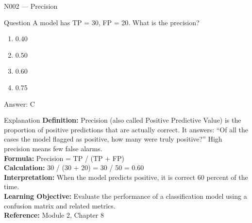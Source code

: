 \documentclass[aspectratio=169,8pt]{beamer}
\begin{document}
	\begin{frame}{N002 --- Precision}
		\begin{block}{Question}
			A model has TP = 30, FP = 20. What is the precision?
			\begin{enumerate}
				\item 0.40
				\item 0.50
				\item 0.60
				\item 0.75
			\end{enumerate}
		\end{block}
		\begin{exampleblock}{Answer: C}\end{exampleblock}
		\begin{block}{Explanation}
			\textbf{Definition:} Precision (also called Positive Predictive Value) is the proportion of positive predictions that are actually correct. It answers: ``Of all the cases the model flagged as positive, how many were truly positive?'' High precision means few false alarms.\\
			\textbf{Formula:} Precision = TP / (TP + FP)\\
			\textbf{Calculation:} 30 / (30 + 20) = 30 / 50 = 0.60\\
			\textbf{Interpretation:} When the model predicts positive, it is correct 60 percent of the time.\\
			\textbf{Learning Objective:} Evaluate the performance of a classification model using a confusion matrix and related metrics.\\
			\textbf{Reference:} Module 2, Chapter 8
		\end{block}
	\end{frame}
	
\end{document}
